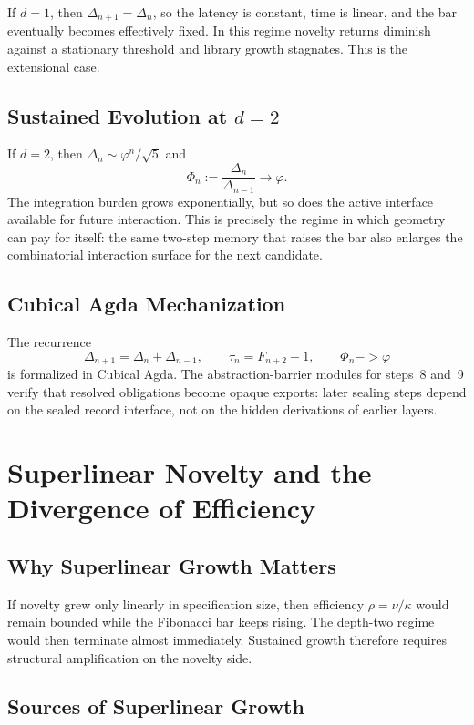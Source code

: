\documentclass[11pt,a4paper]{article}
\def\to{->}%
\theoremstyle{plain}
\theoremstyle{definition}
\theoremstyle{remark}
\begin{document}
If $d=1$, then $\Delta_{n+1}=\Delta_n$, so the latency is constant, time is linear, and the bar eventually becomes effectively fixed.  In this regime novelty returns diminish against a stationary threshold and library growth stagnates.  This is the extensional case.

\subsection{\texorpdfstring{Sustained Evolution at $d=2$}{Sustained Evolution at d=2}}

If $d=2$, then $\Delta_n\sim \varphi^n/\sqrt{5}$ and
\[
  \Phi_n:=\frac{\Delta_n}{\Delta_{n-1}}\longrightarrow \varphi.
\]
The integration burden grows exponentially, but so does the active interface available for future interaction.  This is precisely the regime in which geometry can pay for itself: the same two-step memory that raises the bar also enlarges the combinatorial interaction surface for the next candidate.

\subsection{Cubical Agda Mechanization}

The recurrence
\[
  \Delta_{n+1}=\Delta_n+\Delta_{n-1},
  \qquad
  \tau_n=F_{n+2}-1,
  \qquad
  \Phi_n\to \varphi
\]
is formalized in Cubical Agda.  The abstraction-barrier modules for steps~8 and~9 verify that resolved obligations become opaque exports: later sealing steps depend on the sealed record interface, not on the hidden derivations of earlier layers.

\section{Superlinear Novelty and the Divergence of Efficiency}
\label{sec:novelty}

\subsection{Why Superlinear Growth Matters}

If novelty grew only linearly in specification size, then efficiency $\rho=\nu/\kappa$ would remain bounded while the Fibonacci bar keeps rising.  The depth-two regime would then terminate almost immediately.  Sustained growth therefore requires structural amplification on the novelty side.

\subsection{Sources of Superlinear Growth}
\end{document}
